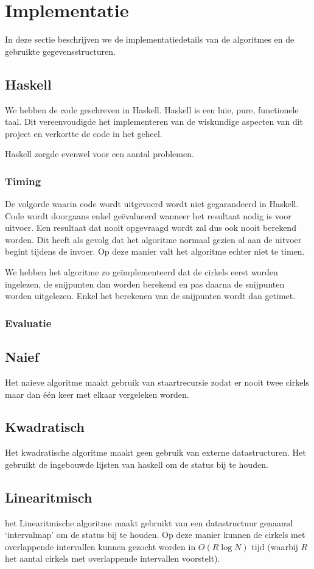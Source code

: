 \section{Implementatie}
\label{sec:implementation}
In deze sectie beschrijven we de implementatiedetails van de algoritmes en de gebruikte gegevensstructuren.

\subsection{Haskell}
We hebben de code geschreven in Haskell. Haskell is een luie, pure,  functionele taal. Dit vereenvoudigde het implementeren van de wiskundige aspecten van dit project en verkortte de code in het geheel.

Haskell zorgde evenwel voor een aantal problemen.

\subsubsection{Timing}
De volgorde waarin code wordt uitgevoerd wordt niet gegarandeerd in Haskell.
Code wordt doorgaans enkel ge\"evalueerd wanneer het resultaat nodig is voor uitvoer.
Een resultaat dat nooit opgevraagd wordt zal dus ook nooit berekend worden.
Dit heeft als gevolg dat het algoritme normaal gezien al aan de uitvoer begint tijdens de invoer.
Op deze manier valt het algoritme echter niet te timen.

We hebben het algoritme zo ge\"implementeerd dat de cirkels eerst worden ingelezen, de snijpunten dan worden berekend en pas daarna de snijpunten worden uitgelezen. Enkel het berekenen van de snijpunten wordt dan getimet.



\subsubsection{Evaluatie}

\subsection{Naief}
Het naieve algoritme maakt gebruik van staartrecursie zodat er nooit twee cirkels maar dan \'e\'en keer met elkaar vergeleken worden.

\subsection{Kwadratisch}
Het kwadratische algoritme maakt geen gebruik van externe datastructuren. Het gebruikt de ingebouwde lijsten van haskell om de status bij te houden.


\subsection{Linearitmisch}
het Linearitmische algoritme maakt gebruikt van een datastructuur genaamd `intervalmap' om de status bij te houden.
Op deze manier kunnen de cirkels met overlappende intervallen kunnen gezocht worden in $O(R\log N)$ tijd (waarbij $R$ het aantal cirkels met overlappende intervallen voorstelt).
